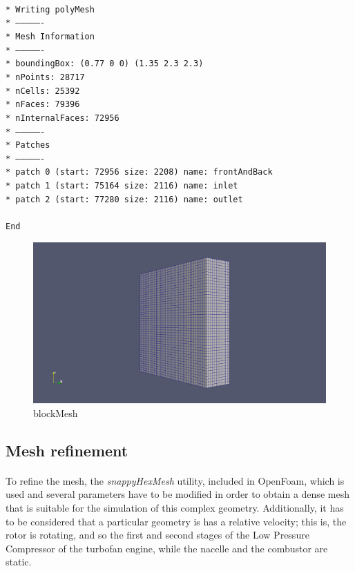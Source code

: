 \texttt{\\*
Writing polyMesh\\*
----------------\\*
Mesh Information\\*
----------------\\*
  boundingBox: (0.77 0 0) (1.35 2.3 2.3)\\*
  nPoints: 28717\\*
  nCells: 25392\\*
  nFaces: 79396\\*
  nInternalFaces: 72956\\*
----------------\\*
Patches\\*
----------------\\*
  patch 0 (start: 72956 size: 2208) name: frontAndBack\\*
  patch 1 (start: 75164 size: 2116) name: inlet\\*
  patch 2 (start: 77280 size: 2116) name: outlet\\
  \\
  End
}

\begin{figure}[h!]
\includegraphics[scale=0.26]{./mesh/screenshots/blockmesh}
\centering
\caption{blockMesh}
\end{figure}

\subsection{Mesh refinement}

\paragraph{}To refine the mesh, the \textit{snappyHexMesh} utility, included in OpenFoam, which is used and several parameters have to be modified in order to obtain a dense mesh that is suitable for the simulation of this complex geometry. Additionally, it has to be considered that a particular geometry is has a relative velocity; this is, the rotor is rotating, and so the first and second stages of the Low Pressure Compressor of the turbofan engine, while the nacelle and the combustor are static. 

